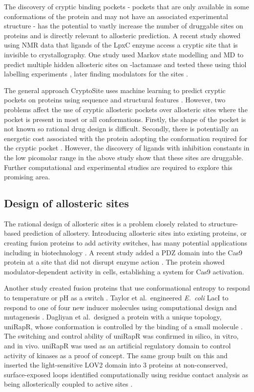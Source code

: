 The discovery of cryptic binding pockets - pockets that are only available in some conformations of the protein and may not have an associated experimental structure - has the potential to vastly increase the number of druggable sites on proteins \cite{Boehr2009} and is directly relevant to allosteric prediction.
A recent study \cite{Lee2016} showed using NMR data that ligands of the LpxC enzyme access a cryptic site that is invisible to crystallography.
One study used Markov state modelling and MD to predict multiple hidden allosteric sites on \textbeta -lactamase and tested these using thiol labelling experiments \cite{Bowman2015}, later finding modulators for the sites \cite{Hart2017}.

The general approach CryptoSite uses machine learning to predict cryptic pockets on proteins using sequence and structural features \cite{Cimermancic2016}.
However, two problems affect the use of cryptic allosteric pockets over allosteric sites where the pocket is present in most or all conformations.
Firstly, the shape of the pocket is not known so rational drug design is difficult.
Secondly, there is potentially an energetic cost associated with the protein adopting the conformation required for the cryptic pocket \cite{Oleinikovas2016}.
However, the discovery of ligands with inhibition constants in the low picomolar range in the above study \cite{Lee2016} show that these sites are druggable.
Further computational and experimental studies are required to explore this promising area.


\subsection{Design of allosteric sites}

The rational design of allosteric sites is a problem closely related to structure-based prediction of allostery.
Introducing allosteric sites into existing proteins, or creating fusion proteins to add activity switches, has many potential applications including in biotechnology \cite{Makhlynets2015}.
A recent study added a PDZ domain into the Cas9 protein at a site that did not disrupt enzyme action \cite{Oakes2016}.
The protein showed modulator-dependent activity in cells, establishing a system for Cas9 activation.

Another study created fusion proteins that use conformational entropy to respond to temperature or pH as a switch \cite{Choi2015}.
Taylor et al.\ engineered \textit{E.\ coli} LacI to respond to one of four new inducer molecules using computational design and mutagenesis \cite{Taylor2016}.
Dagliyan et al.\ designed a protein with a unique topology, uniRapR, whose conformation is controlled by the binding of a small molecule \cite{Dagliyan2013}.
The switching and control ability of uniRapR was confirmed in silico, in vitro, and in vivo.
uniRapR was used as an artificial regulatory domain to control activity of kinases as a proof of concept.
The same group built on this and inserted the light-sensitive LOV2 domain into 3 proteins at non-conserved, surface-exposed loops identified computationally using residue contact analysis as being allosterically coupled to active sites \cite{Dagliyan2016}.


